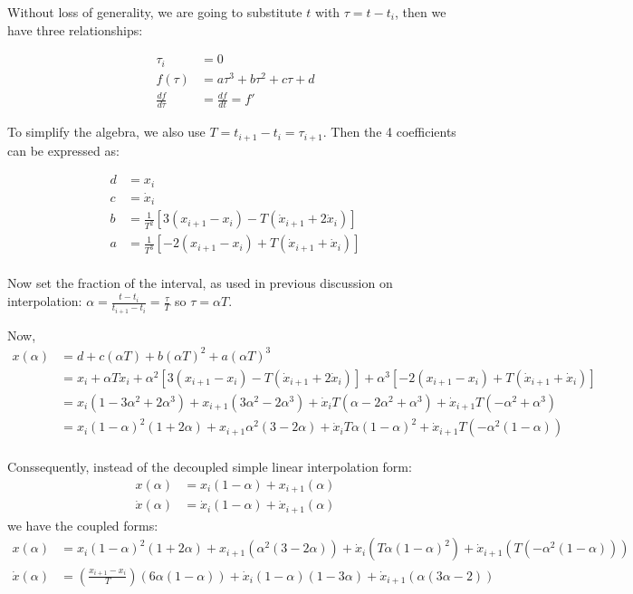 \documentclass[11pt,fleqn]{report}
\begin{document}
Without loss of generality, we are going to substitute $t$ with
$\tau = t - t_i$, then we have three relationships:

\begin{align*}
\tau_i &= 0 \\
f(\tau) &= a\tau ^3 + b \tau ^2 + c \tau + d \\
\frac{df}{d \tau} &= \frac{df}{dt} = f'
\end{align*}

To simplify the algebra, we also use $T = t_{i+1} - t_i = \tau_{i+1}$. Then the
4 coefficients can be expressed as:

\begin{align*}
d  &=  x_i  \\
c  &=  {\dot x}_i \\
b  &= \frac{1}{T^2} [  3(x_{i+1} - x_i) - T( {\dot x}_{i+1} + 2 {\dot x}_i)] \\
a  &= \frac{1}{T^3} [ -2(x_{i+1} - x_i) + T( {\dot x}_{i+1} +   {\dot x}_i)] \\
\end{align*}

Now set the fraction of the interval, as used in previous discussion on
interpolation: $\alpha = \frac{t-t_i}{t_{i+1} - t_i} = \frac{\tau}{T}$ so $\tau
= \alpha T$.

Now,
\begin{align*}
x(\alpha) & = d + c (\alpha T) + b (\alpha T)^2 + a (\alpha T)^3 \\
{} &  = x_i + \alpha T {\dot x}_i +
              \alpha^2[ 3(x_{i+1} - x_i) - T( {\dot x}_{i+1} + 2 {\dot x}_i)] +
              \alpha^3[-2(x_{i+1} - x_i) + T( {\dot x}_{i+1} +   {\dot x}_i)]\\
{} &=  x_i              (1 -3 \alpha ^2 + 2 \alpha^3) +
       x_{i+1}          (3 \alpha ^2 - 2 \alpha ^3) +
       {\dot x}_i     T (\alpha - 2 \alpha^2 + \alpha ^3) +
       {\dot x}_{i+1} T ( - \alpha^2 + \alpha ^3) \\
{} &=  x_i              (1 - \alpha)^2(1 + 2 \alpha) +
       x_{i+1}          \alpha ^2 (3 - 2 \alpha) +
       {\dot x}_i     T \alpha (1 - \alpha)^2 +
       {\dot x}_{i+1} T ( - \alpha^2 (1 - \alpha)) \\
\end{align*}


Conssequently, instead of the decoupled simple linear interpolation form:
\begin{align*}
x(\alpha) &= x_i (1-\alpha) + x_{i+1}(\alpha) \\
{\dot x}(\alpha) &= {\dot x}_i (1-\alpha) + {\dot x}_{i+1}(\alpha)
\end{align*}
we have the coupled forms:
\begin{align}
x(\alpha) & =  x_i  (1 - \alpha)^2(1 + 2 \alpha) +
             x_{i+1} (\alpha ^2 (3 - 2 \alpha)) +
             {\dot x}_i (    T \alpha (1 - \alpha)^2) +
             {\dot x}_{i+1} (T ( - \alpha^2 (1 - \alpha))) \\
{\dot x}(\alpha) & = \left(\frac{x_{i+1}-x_i}{T} \right) (6 \alpha (1 - \alpha)) +
                   {\dot x}_i            (1- \alpha) (1 - 3 \alpha) +
                   {\dot x}_{i+1}        (\alpha (3 \alpha - 2))
\end{align}
\end{document}
